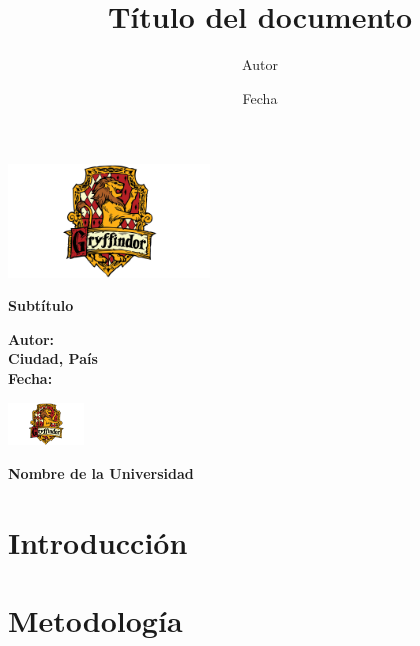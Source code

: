 \documentclass[12pt]{article}
\title{Título del documento}
\author{Autor}
\date{Fecha}
\begin{document}
	
	\begin{titlepage}
		\begin{center}
			\vspace*{1cm}
			
			\includegraphics[width=0.4\textwidth]{logo.png}
			
			\vspace{1.5cm}
			
			\textbf{\Huge \thetitle}
			
			\vspace{0.5cm}
			
			\textbf{\Large Subtítulo}
			
			\vspace{1.5cm}
			
			\textbf{\Large Autor:} \theauthor \\
			\textbf{\Large Ciudad, País} \\
			\textbf{\Large Fecha:} \thedate
			
			\vfill
			
			\vspace{0.8cm}
			
			\includegraphics[width=0.15\textwidth]{logo.png}
			
			\vspace{1cm}
			
			\textbf{\Large Nombre de la Universidad}
			
		\end{center}
	\end{titlepage}
	
	\tableofcontents
	\newpage
	
	\section{Introducción}
	
	\section{Metodología}
	
\end{document}
